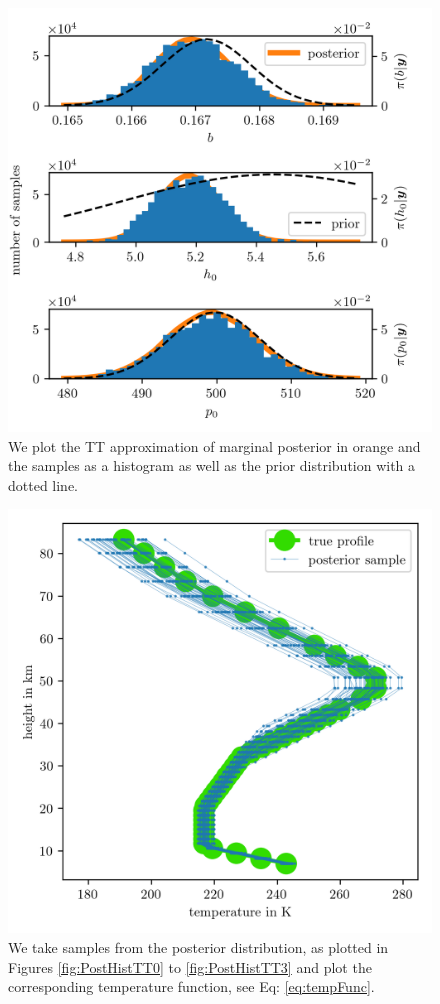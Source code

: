 \begin{figure}[ht!]
	\centering
	\includegraphics{PHdPTPost4.png}
	\caption[Histograms and TT approximation of posterior distribution as well as hyper-prior distribution.]{We plot the TT approximation of marginal posterior in orange and the samples as a histogram as well as the prior distribution with a dotted line.}
	\label{fig:PostHistTT4}
\end{figure}

\begin{figure}[ht!]
	\centering
	\includegraphics{TempPostMeanSigm.png}
	\caption[Temperature posterior samples.]{We take samples from the posterior distribution, as plotted in Figures \ref{fig:PostHistTT0} to \ref{fig:PostHistTT3} and plot the corresponding temperature function, see Eq: \ref{eq:tempFunc}. }
	\label{fig:TempPost}
\end{figure}

